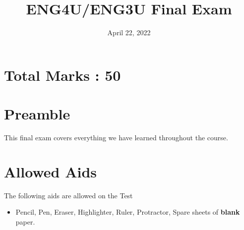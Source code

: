 \documentclass[12pt]{article} %
\title{ENG4U/ENG3U Final Exam}
\date{April 22, 2022}
\begin{document}
    \renewcommand*{\coursecode}{MCR3U Quiz} %
    \renewcommand*{\assgnnumber}{1} %
    \renewcommand*{\submdate}{November, 2021} %
    \renewcommand*{\studentfname}{\textbf{Name:}} %
    \renewcommand*{\studentlname}{} %

    \renewcommand\qedsymbol{$\blacksquare$}
    \setfigpath
    \fancyhfoffset[L,O]{0pt} %




	\maketitle
	\section{Total Marks : 50}
	\section{Preamble}
	This final exam covers everything we have learned throughout the course.
	\section{Allowed Aids}
	The following aids are allowed on the Test
	\begin{itemize}
		\item Pencil, Pen, Eraser, Highlighter, Ruler, Protractor, Spare sheets of \textbf{blank} paper.
	\end{itemize}
\end{document}
